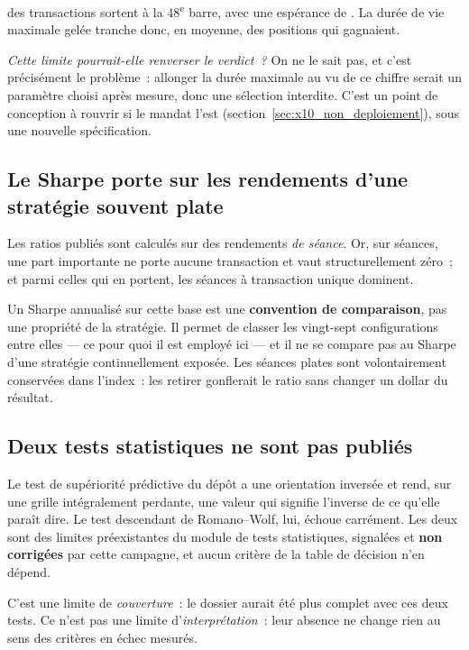 \XTenTimeShare{} des transactions sortent à la 48\textsuperscript{e} barre,
avec une espérance de . La durée de vie maximale gelée
tranche donc, en moyenne, des positions qui gagnaient.

\emph{Cette limite pourrait-elle renverser le verdict~?} On ne le sait pas, et
c'est précisément le problème~: allonger la durée maximale au vu de ce chiffre
serait un paramètre choisi après mesure, donc une sélection interdite. C'est
un point de conception à rouvrir si le mandat l'est
(section~\ref{sec:x10_non_deploiement}), sous une nouvelle spécification.

\subsection{Le Sharpe porte sur les rendements d'une stratégie souvent plate}

Les ratios publiés sont calculés sur des rendements \emph{de séance}. Or, sur
\XTenSampleSessions{} séances, une part importante ne porte aucune
transaction et vaut structurellement zéro~; et parmi celles qui en portent,
les séances à transaction unique dominent.

Un Sharpe annualisé sur cette base est une \textbf{convention de comparaison},
pas une propriété de la stratégie. Il permet de classer les vingt-sept
configurations entre elles --- ce pour quoi il est employé ici --- et il ne se
compare pas au Sharpe d'une stratégie continuellement exposée. Les séances
plates sont volontairement conservées dans l'index~: les retirer gonflerait le
ratio sans changer un dollar du résultat.

\subsection{Deux tests statistiques ne sont pas publiés}

Le test de supériorité prédictive du dépôt a une orientation inversée et rend,
sur une grille intégralement perdante, une valeur qui signifie l'inverse de ce
qu'elle paraît dire. Le test descendant de Romano--Wolf, lui, échoue
carrément. Les deux sont des limites préexistantes du module de tests
statistiques, signalées et \textbf{non corrigées} par cette campagne, et
aucun critère de la table de décision n'en dépend.

C'est une limite de \emph{couverture}~: le dossier aurait été plus complet
avec ces deux tests. Ce n'est pas une limite d'\emph{interprétation}~: leur
absence ne change rien au sens des
\XTenCriteriaFailingInterpretable{} critères en échec mesurés.

